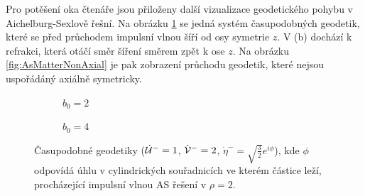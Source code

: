 Pro potěšení oka čtenáře jsou přiloženy další vizualizace geodetického pohybu v Aichelburg-Sexlově řešní. Na obrázku \ref{fig:AsMatter02} se jedná systém časupodobných geodetik, které se před
průchodem impulsní vlnou šíří od osy symetrie $z$. V (b) dochází k refrakci, která otáčí směr šíření směrem zpět k ose $z$.
Na obrázku \ref{fig:AsMatterNonAxial} je pak zobrazení průchodu geodetik, které nejsou uspořádáný axiálně symetricky.

\begin{figure}[ht]
    \centering
    \begin{subfigure}[b]{0.45\textwidth}
        \caption{$b_0 = 2$}
    \end{subfigure}
    \hfill
    \begin{subfigure}[b]{0.45\textwidth}
        \caption{$b_0 = 4$}
    \end{subfigure}
    \caption{Časupodobné geodetiky ($\dot {\mathcal{U}}^-=1$, $\dot {\mathcal{V}}^-=2$, $\dot \eta^-=\sqrt{\frac{3}{2}} e^{i \phi}$), kde $\phi$ odpovídá úhlu v
    cylindrických souřadnicích ve kterém částice leží, procházející impulsní vlnou AS řešení v $\rho=2$.}
    \label{fig:AsMatter02}
\end{figure}

